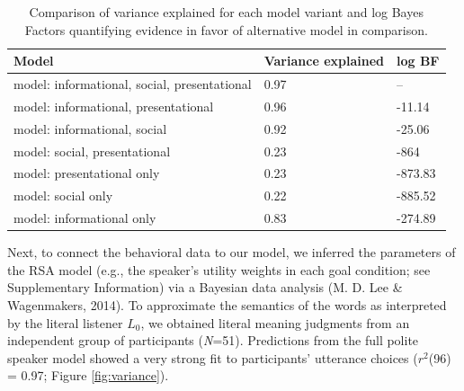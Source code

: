\documentclass[floatsintext,man]{apa6}
\theoremstyle{definition}
\theoremstyle{definition}
\theoremstyle{definition}
\theoremstyle{remark}
\begin{document}
\begin{table}[tbp]
\begin{center}
\begin{threeparttable}
\caption{\label{tab:comparisonTable}Comparison of variance explained for each model variant and log Bayes Factors quantifying evidence in favor of alternative model in comparison.}
\begin{tabular}{lll}
\toprule
Model & \multicolumn{1}{c}{Variance 
explained} & \multicolumn{1}{c}{log BF}\\
\midrule
model: 
informational, 
social, 
presentational & 0.97 & --\\
model: 
informational, 
presentational & 0.96 & -11.14\\
model: 
informational, 
social & 0.92 & -25.06\\
model: 
social, 
presentational & 0.23 & -864\\
model: 
presentational 
only & 0.23 & -873.83\\
model: 
social only & 0.22 & -885.52\\
model: 
informational 
only & 0.83 & -274.89\\
\bottomrule
\end{tabular}
\end{threeparttable}
\end{center}
\end{table}

Next, to connect the behavioral data to our model, we inferred the
parameters of the RSA model (e.g., the speaker's utility weights in each
goal condition; see Supplementary Information) via a Bayesian data
analysis (M. D. Lee \& Wagenmakers, 2014). To approximate the semantics
of the words as interpreted by the literal listener \(L_0\), we obtained
literal meaning judgments from an independent group of participants
(\emph{N}=51). Predictions from the full polite speaker model showed a
very strong fit to participants' utterance choices (\(r^2\)(96) = 0.97;
Figure \ref{fig:variance}).
\end{document}

